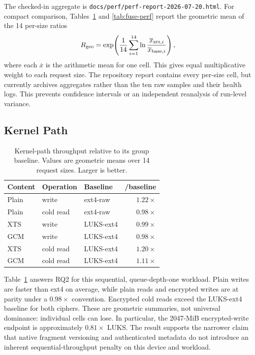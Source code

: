 The checked-in aggregate is
\texttt{docs/perf/perf-report-2026-07-20.html}.  For compact comparison,
Tables~\ref{tab:kernel-perf} and
\ref{tab:fuse-perf} report the geometric mean of the 14 per-size ratios
\[
  R_{\mathrm{geo}} =
  \exp\!\left(\frac{1}{14}\sum_{i=1}^{14}
  \ln\frac{\overline{x}_{\textsc{sfs}{},i}}{\overline{x}_{\mathrm{base},i}}\right),
\]
where each \(\overline{x}\) is the arithmetic mean for one cell.  This gives
equal multiplicative weight to each request size.  The repository report
contains every per-size cell, but currently archives aggregates rather than
the ten raw samples and their health logs.  This prevents confidence intervals
or an independent reanalysis of run-level variance.

\subsection{Kernel Path}
\label{subsec:eval-kernel}

\begin{table}[t]
  \centering
  \caption{Kernel-path throughput relative to its group baseline.  Values are
  geometric means over 14 request sizes.  Larger is better.}
  \label{tab:kernel-perf}
  \begin{tabular}{lllr}
    \toprule
    Content & Operation & Baseline & \sfs{}/baseline \\
    \midrule
    Plain & write & ext4-raw & \(1.22\times\) \\
    Plain & cold read & ext4-raw & \(0.98\times\) \\
    XTS & write & LUKS-ext4 & \(0.99\times\) \\
    GCM & write & LUKS-ext4 & \(0.98\times\) \\
    XTS & cold read & LUKS-ext4 & \(1.20\times\) \\
    GCM & cold read & LUKS-ext4 & \(1.11\times\) \\
    \bottomrule
  \end{tabular}
\end{table}

Table~\ref{tab:kernel-perf} answers RQ2 for this sequential, queue-depth-one
workload.  Plain writes are faster than ext4 on average, while plain reads and
encrypted writes are at parity under a \(0.98\times\) convention.  Encrypted
cold reads exceed the LUKS-ext4 baseline for both ciphers.  These are
geometric summaries, not universal dominance: individual cells can lose.  In
particular, the 2047-MiB encrypted-write endpoint is approximately
\(0.81\times\) LUKS.  The result supports the narrower claim that native
fragment versioning and authenticated metadata do not introduce an inherent
sequential-throughput penalty on this device and workload.

